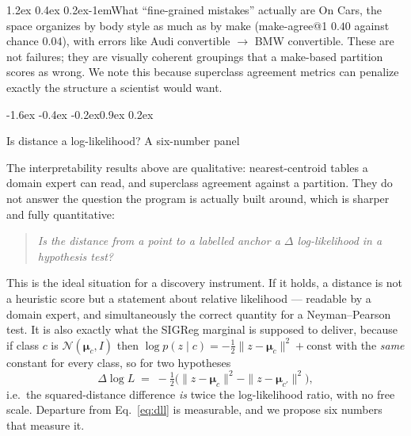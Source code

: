 \documentclass{article}
\makeatletter
\renewcommand\subsection{\@startsection{subsection}{2}{\z@}%
  {-1.6ex \@plus -0.4ex \@minus -0.2ex}{0.9ex \@plus 0.2ex}%
  {\normalsize\bf\raggedright}}
\renewcommand\paragraph{\@startsection{paragraph}{4}{\z@}%
  {1.2ex \@plus 0.4ex \@minus 0.2ex}{-1em}{\normalsize\bf}}
\newcommand{\N}{\mathcal{N}}
\newcommand{\mmu}{\boldsymbol{\mu}}
\makeatother
\begin{document}
\paragraph{What ``fine-grained mistakes'' actually are}
On Cars, the space organizes by body style as much as by make (make-agree@1
$0.40$ against chance $0.04$), with errors like Audi convertible $\to$ BMW
convertible. These are not failures; they are visually coherent groupings that
a make-based partition scores as wrong. We note this because superclass
agreement metrics can penalize exactly the structure a scientist would want.

\subsection{Is distance a log-likelihood? A six-number panel}
\label{sec:panel}

The interpretability results above are qualitative: nearest-centroid tables a
domain expert can read, and superclass agreement against a partition. They do
not answer the question the program is actually built around, which is sharper
and fully quantitative:

\begin{quote}
\emph{Is the distance from a point to a labelled anchor a $\Delta$ log-likelihood
in a hypothesis test?}
\end{quote}

This is the ideal situation for a discovery instrument. If it holds, a distance
is not a heuristic score but a statement about relative likelihood --- readable
by a domain expert, and simultaneously the correct quantity for a
Neyman--Pearson test. It is also exactly what the SIGReg marginal is supposed to
deliver, because if class $c$ is $\N(\mmu_c, I)$ then
$\log p(z\mid c) = -\tfrac12\|z-\mmu_c\|^2 + \text{const}$ with the \emph{same}
constant for every class, so for two hypotheses
\begin{equation}
\Delta \log L \;=\; -\tfrac12\Big(\|z-\mmu_c\|^2 - \|z-\mmu_{c'}\|^2\Big),
\label{eq:dll}
\end{equation}
i.e.\ the squared-distance difference \emph{is} twice the log-likelihood ratio,
with no free scale. Departure from Eq.~\eqref{eq:dll} is measurable, and we
propose six numbers that measure it.
\end{document}
